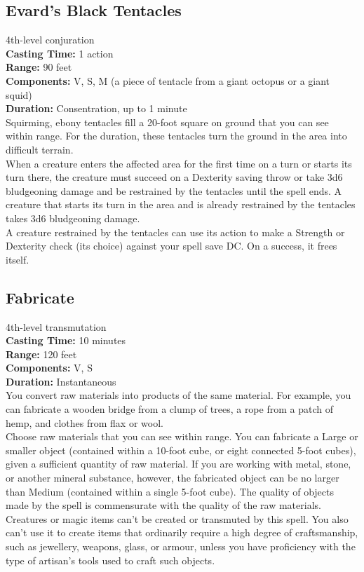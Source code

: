 \documentclass[11pt, A4paper, english]{article}
\begin{document}
		\subsection{Evard's Black Tentacles}
4th-level conjuration \\
\textbf{Casting Time:} 1 action \\
\textbf{Range:} 90 feet \\
\textbf{Components:} V, S, M (a piece of tentacle from a giant octopus or a giant squid) \\
\textbf{Duration:} Consentration, up to 1 minute \\
Squirming, ebony tentacles fill a 20-foot square on ground that you can see within range. For the duration, these tentacles turn the ground in the area into difficult terrain. \\
When a creature enters the affected area for the first time on a turn or starts its turn there, the creature must succeed on a Dexterity saving throw or take 3d6 bludgeoning damage and be restrained by the tentacles until the spell ends. A creature that starts its turn in the area and is already restrained by the tentacles takes 3d6 bludgeoning damage. \\
A creature restrained by the tentacles can use its action to make a Strength or Dexterity check (its choice) against your spell save DC. On a success, it frees itself.

		\subsection{Fabricate}
4th-level transmutation \\
\textbf{Casting Time:} 10 minutes \\
\textbf{Range:} 120 feet \\
\textbf{Components:} V, S \\
\textbf{Duration:} Instantaneous \\
You convert raw materials into products of the same material. For example, you can fabricate a wooden bridge from a clump of trees, a rope from a patch of hemp, and clothes from flax or wool. \\
Choose raw materials that you can see within range. You can fabricate a Large or smaller object (contained within a 10-foot cube, or eight connected 5-foot cubes), given a sufficient quantity of raw material. If you are working with metal, stone, or another mineral substance, however, the fabricated object can be no larger than Medium (contained within a single 5-foot cube). The quality of objects made by the spell is commensurate with the quality of the raw materials. \\
Creatures or magic items can’t be created or transmuted by this spell. You also can't use it to create items that ordinarily require a high degree of craftsmanship, such as jewellery, weapons, glass, or armour, unless you have proficiency with the type of artisan’s tools used to craft such objects.
\end{document}
